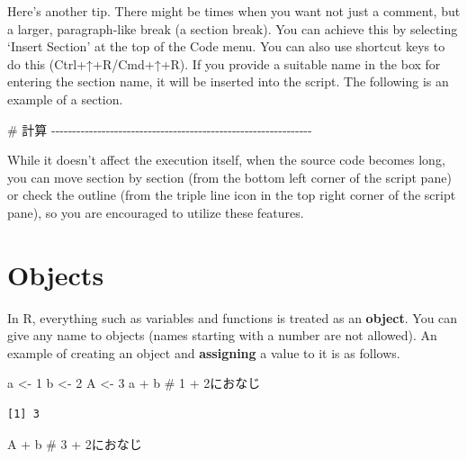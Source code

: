 \documentclass[
  a4paper,
]{book}
\newenvironment{Shaded}{\begin{snugshade}}{\end{snugshade}}
\newcommand{\CommentTok}[1]{\textcolor[rgb]{0.37,0.37,0.37}{#1}}
\newcommand{\DecValTok}[1]{\textcolor[rgb]{0.68,0.00,0.00}{#1}}
\newcommand{\NormalTok}[1]{\textcolor[rgb]{0.00,0.23,0.31}{#1}}
\newcommand{\OtherTok}[1]{\textcolor[rgb]{0.00,0.23,0.31}{#1}}
\newcommand{\SpecialCharTok}[1]{\textcolor[rgb]{0.37,0.37,0.37}{#1}}
\begin{document}
Here's another tip. There might be times when you want not just a
comment, but a larger, paragraph-like break (a section break). You can
achieve this by selecting `Insert Section' at the top of the Code menu.
You can also use shortcut keys to do this (Ctrl+↑+R/Cmd+↑+R). If you
provide a suitable name in the box for entering the section name, it
will be inserted into the script. The following is an example of a
section.

\begin{Shaded}
\begin{Highlighting}[]
\CommentTok{\# 計算 {-}{-}{-}{-}{-}{-}{-}{-}{-}{-}{-}{-}{-}{-}{-}{-}{-}{-}{-}{-}{-}{-}{-}{-}{-}{-}{-}{-}{-}{-}{-}{-}{-}{-}{-}{-}{-}{-}{-}{-}{-}{-}{-}{-}{-}{-}{-}{-}{-}{-}{-}{-}{-}{-}{-}{-}{-}{-}{-}{-}{-}{-}}
\end{Highlighting}
\end{Shaded}

While it doesn't affect the execution itself, when the source code
becomes long, you can move section by section (from the bottom left
corner of the script pane) or check the outline (from the triple line
icon in the top right corner of the script pane), so you are encouraged
to utilize these features.

\section{Objects}\label{objects}

In R, everything such as variables and functions is treated as an
\textbf{object}. You can give any name to objects (names starting with a
number are not allowed). An example of creating an object and
\textbf{assigning} a value to it is as follows.

\begin{Shaded}
\begin{Highlighting}[]
\NormalTok{a }\OtherTok{\textless{}{-}} \DecValTok{1}
\NormalTok{b }\OtherTok{\textless{}{-}} \DecValTok{2}
\NormalTok{A }\OtherTok{\textless{}{-}} \DecValTok{3}
\NormalTok{a }\SpecialCharTok{+}\NormalTok{ b }\CommentTok{\# 1 + 2におなじ}
\end{Highlighting}
\end{Shaded}

\begin{verbatim}
[1] 3
\end{verbatim}

\begin{Shaded}
\begin{Highlighting}[]
\NormalTok{A }\SpecialCharTok{+}\NormalTok{ b }\CommentTok{\# 3 + 2におなじ}
\end{Highlighting}
\end{Shaded}
\end{document}

